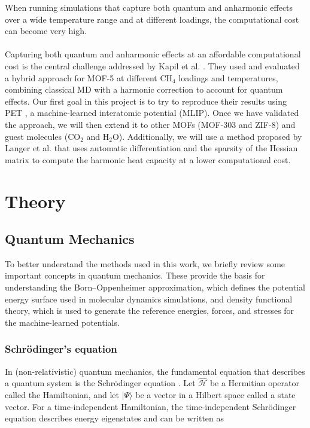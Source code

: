 \documentclass[12pt,a4paper]{article}
\numberwithin{equation}{section}
\begin{document}
When running simulations that capture both quantum and anharmonic effects over a wide temperature range and at different loadings,
the computational cost can become very high.
\\
\\
Capturing both quantum and anharmonic effects at an affordable computational cost is the central challenge addressed by Kapil et al. \cite{kapil2019}.
They used and evaluated a hybrid approach for MOF-5 at different $\mathrm{CH_4}$ loadings and temperatures,
combining classical MD with a harmonic correction to account for quantum effects.
Our first goal in this project is to try to reproduce their results using PET \cite{pet}, a machine-learned interatomic potential (MLIP).
Once we have validated the approach, we will then extend it to other MOFs (MOF-303 and ZIF-8) and guest molecules ($\mathrm{CO_2}$ and $\mathrm{H_2O}$).
Additionally, we will use a method proposed by Langer et al. \cite{sadmof}
that uses automatic differentiation and the sparsity of the Hessian matrix
to compute the harmonic heat capacity at a lower computational cost.

\section{Theory}
\label{sec:theory}

\subsection{Quantum Mechanics}
\label{sec:qm}

To better understand the methods used in this work, we briefly review some important concepts in quantum mechanics.
These provide the basis for understanding the Born--Oppenheimer approximation,
which defines the potential energy surface used in molecular dynamics simulations,
and density functional theory, which is used to generate the reference energies, forces, and stresses for the machine-learned potentials.

\subsubsection{Schrödinger's equation}

In (non-relativistic) quantum mechanics, the fundamental equation that describes a quantum system is the Schrödinger equation \cite{cohen-tannoudji2020}.
Let $\hat{\mathcal H}$ be a Hermitian operator called the Hamiltonian, and let $|\Psi\rangle$ be a vector in a Hilbert space called a state vector.
For a time-independent Hamiltonian, the time-independent Schrödinger equation describes energy eigenstates and can be written as
\end{document}
